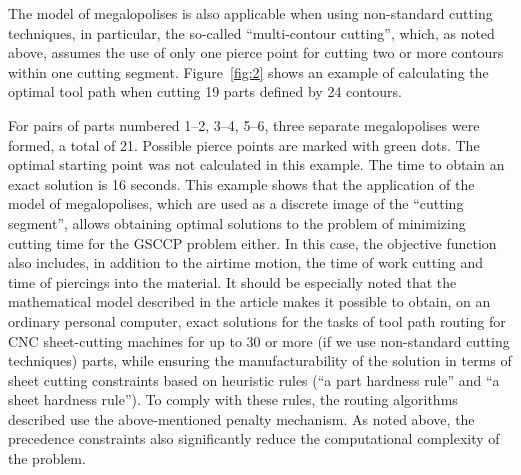 \documentclass[numbers,sort&compress]{IntechOpen-Book}%
\begin{document}
The model of megalopolises is also applicable
when using non-standard cutting techniques,
in particular, the so-called ``multi-contour cutting'',
which, as noted above, assumes the use of only
one pierce point
for cutting two or more contours within one cutting segment.
Figure~\ref{fig:2}
shows an example of calculating the optimal tool path
when cutting 19 parts defined by 24 contours.

\begin{figure}
  \centering
\end{figure}

For pairs of parts numbered 1--2, 3--4, 5--6,
three separate megalopolises were formed,
a total of 21.
Possible pierce points are marked with green dots.
The optimal starting point was not calculated in this example.
The time to obtain an exact solution is 16 seconds.
This example shows that the application of the model of megalopolises, which are used as a discrete image of the ``cutting segment'', allows obtaining optimal solutions to the problem of minimizing cutting time for the GSCCP problem \cite{bibx:305} either.
In this case,
the objective function also includes,
in addition to the airtime motion,
the time of work cutting and time of piercings into the material.
It should be especially noted
that the mathematical model described in the article
makes it possible to obtain,
on an ordinary personal computer,
exact solutions for the tasks of tool path routing for CNC sheet-cutting machines for up to 30 or more (if we use non-standard cutting techniques) parts, while ensuring the manufacturability of the solution in terms of sheet cutting constraints based on heuristic rules (``a part hardness rule'' and ``a sheet hardness rule''). To comply with these rules, the routing algorithms described use the above-mentioned penalty mechanism. As noted above, the precedence constraints also significantly reduce the computational complexity of the problem.
\end{document}
